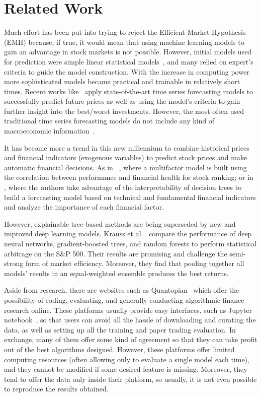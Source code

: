 \chapter{Related Work}
\label{chap:related}

Much effort has been put into trying to reject the Efficient Market Hypothesis (EMH) because, if true, it would mean that using machine learning models to gain an advantage in stock markets is not possible. However, initial models used for prediction were simple linear statistical models~\cite{emh}, and many relied on expert's criteria to guide the model construction. With the increase in computing power more sophisticated models became practical and trainable in relatively short times. Recent works like~\cite{fischer2018deep} apply state-of-the-art time series forecasting models to successfully predict future prices as well as using the model's criteria to gain further insight into the best/worst investments. However, the most often used traditional time series forecasting models do not include any kind of macroeconomic information~\cite{zivot2007modeling}.

It has become more a trend in this new millennium to combine historical prices and financial indicators (exogenous variables) to predict stock prices and make automatic financial decisions. As in ~\cite{sevastjanov2009stock}, where a multifactor model is built using the correlation between performance and financial health  for stock ranking; or in
 \cite{andriyashin2008recursive}, where the authors take advantage of the interpretability of decision trees to build a forecasting model based on technical and fundamental financial indicators and analyze the importance of each financial factor.

However, explainable tree-based methods are being superseded by new and improved deep learning models. Krauss et al.~\cite{krauss2017deep} compare the performance of deep neural networks, gradient-boosted trees, and random forests to perform statistical arbitrage on the S\&P 500. Their results are promising and challenge the semi-strong form of market efficiency. Moreover, they find that pooling together all models' results in an equal-weighted ensemble produces the best returns. 

Aside from research, there are websites such as Quantopian~\cite{quantopian} which offer the possibility of coding,  evaluating, and generally conducting algorithmic finance research online. These platforms usually provide easy interfaces, such as Jupyter notebook~\cite{jupyter}, so that users can avoid all the hassle of downloading and curating the data, as well as setting up all the training and paper trading evaluation. In exchange, many of them offer some kind of agreement so that they can take profit out of the best algorithms designed. However, these platforms offer limited computing resources (often allowing only to evaluate a single model each time), and they cannot be modified if some desired feature is missing. Moreover, they tend to offer the data only inside their platform, so usually, it is not even possible to reproduce the results obtained.



